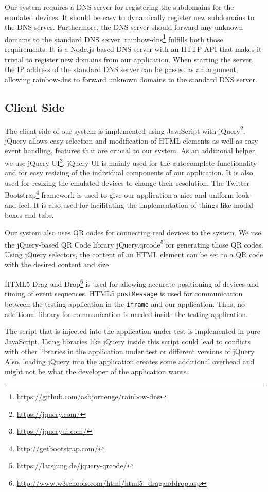 Our system requires a DNS server for registering the subdomains for the emulated devices. It should be easy to dynamically register new subdomains to the DNS server. Furthermore, the DNS server should forward any unknown domains to the standard DNS server. rainbow-dns\footnote{\url{https://github.com/asbjornenge/rainbow-dns}} fulfills both those requirements. It is a Node.js-based DNS server with an HTTP API that makes it trivial to register new domains from our application. When starting the server, the IP address of the standard DNS server can be passed as an argument, allowing rainbow-dns to forward unknown domains to the standard DNS server.

\subsection{Client Side}

The client side of our system is implemented using JavaScript with jQuery\footnote{\url{https://jquery.com/}}. jQuery allows easy selection and modification of HTML elements as well as easy event handling, features that are crucial to our system. As an additional helper, we use jQuery UI\footnote{\url{https://jqueryui.com/}}. jQuery UI is mainly used for the autocomplete functionality and for easy resizing of the individual components of our application. It is also used for resizing the emulated devices to change their resolution. The Twitter Bootstrap\footnote{\url{http://getbootstrap.com/}} framework is used to give our application a nice and uniform look-and-feel. It is also used for facilitating the implementation of things like modal boxes and tabs. 

Our system also uses QR codes for connecting real devices to the system. We use the jQuery-based QR Code library jQuery.qrcode\footnote{\url{https://larsjung.de/jquery-qrcode/}} for generating those QR codes. Using jQuery selectors, the content of an HTML element can be set to a QR code with the desired content and size.

HTML5 Drag and Drop\footnote{\url{http://www.w3schools.com/html/html5_draganddrop.asp}} is used for allowing accurate positioning of devices and timing of event sequences. HTML5 \lstinline|postMessage| is used for communication between the testing application in the \lstinline|iframe| and our application. Thus, no additional library for communication is needed inside the testing application.

The script that is injected into the application under test is implemented in pure JavaScript. Using libraries like jQuery inside this script could lead to conflicts with other libraries in the application under test or different versions of jQuery. Also, loading jQuery into the application creates some additional overhead and might not be what the developer of the application wants.

